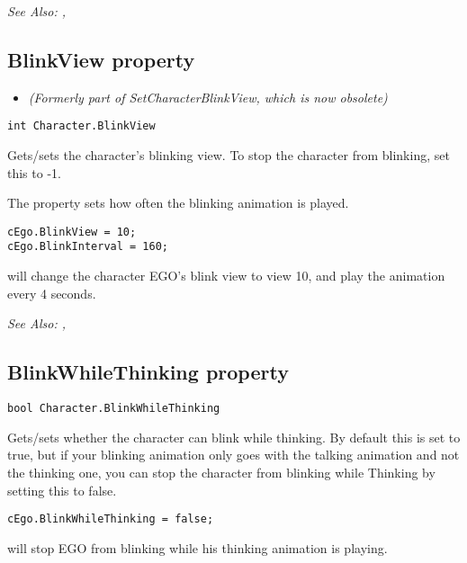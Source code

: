 \it{See Also:} ,



\subsection{BlinkView property}\label{Character.BlinkView}%

\begin{itemize}
\item \it{(Formerly part of SetCharacterBlinkView, which is now obsolete)}
\end{itemize}

\begin{verbatim}
int Character.BlinkView
\end{verbatim}
Gets/sets the character's blinking view. To stop the character from blinking, set
this to -1.

The  property sets how often the blinking
animation is played.

\begin{verbatim}
cEgo.BlinkView = 10;
cEgo.BlinkInterval = 160;
\end{verbatim}
will change the character EGO's blink view to view 10, and play the animation every 4 seconds.

\it{See Also:} ,


\subsection{BlinkWhileThinking property}\label{Character.BlinkWhileThinking}%

\begin{verbatim}
bool Character.BlinkWhileThinking
\end{verbatim}
Gets/sets whether the character can blink while thinking. By default this is set to true,
but if your blinking animation only goes with the talking animation and not the thinking
one, you can stop the character from blinking while Thinking by setting this to false.

\begin{verbatim}
cEgo.BlinkWhileThinking = false;
\end{verbatim}
will stop EGO from blinking while his thinking animation is playing.


